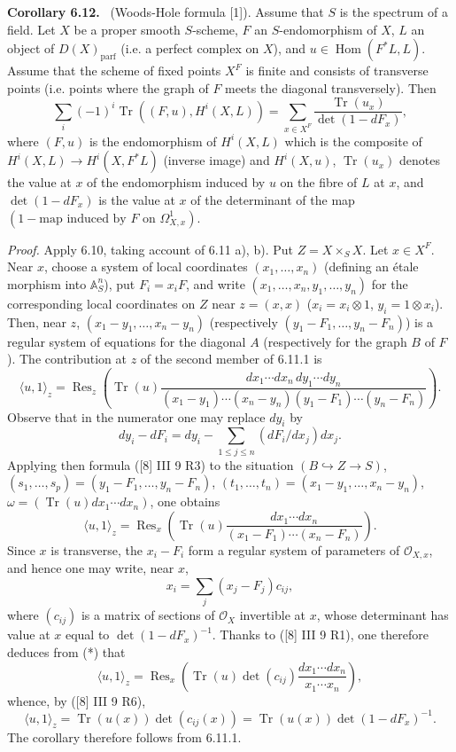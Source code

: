 \documentclass[11pt]{article}
\newenvironment{statement}[1]{\par\medskip\noindent\textbf{#1.}\ }{\par\medskip}
\DeclareMathOperator{\Hom}{Hom}
\providecommand{\OO}{\mathcal{O}}
\providecommand{\parf}{\mathrm{parf}}
\providecommand{\Hom}{\operatorname{Hom}}
\providecommand{\parf}{\mathrm{parf}}
\begin{document}
\begin{statement}{Corollary 6.12}
(Woods-Hole formula [1]). Assume that $S$ is the spectrum of a field. Let $X$ be a proper smooth $S$-scheme, $F$ an $S$-endomorphism of $X$, $L$ an object of $D(X)_{\parf}$ (i.e. a perfect complex on $X$), and $u\in\Hom(F^*L,L)$. Assume that the scheme of fixed points $X^F$ is finite and consists of transverse points (i.e. points where the graph of $F$ meets the diagonal transversely). Then
\[
\sum_i(-1)^i\operatorname{Tr}((F,u),H^i(X,L))=
\sum_{x\in X^F}\frac{\operatorname{Tr}(u_x)}{\det(1-dF_x)},
\]
where $(F,u)$ is the endomorphism of $H^i(X,L)$ which is the composite of $H^i(X,L)\to H^i(X,F^*L)$ (inverse image) and $H^i(X,u)$, $\operatorname{Tr}(u_x)$ denotes the value at $x$ of the endomorphism induced by $u$ on the fibre of $L$ at $x$, and $\det(1-dF_x)$ is the value at $x$ of the determinant of the map $(1-\text{map induced by }F\text{ on }\Omega^1_{X,x})$.

\emph{Proof.} Apply 6.10, taking account of 6.11 a), b). Put $Z=X\times_S X$. Let $x\in X^F$. Near $x$, choose a system of local coordinates $(x_1,\ldots,x_n)$ (defining an étale morphism into $\mathbb A_S^n$), put $F_i=x_iF$, and write $(x_1,\ldots,x_n,y_1,\ldots,y_n)$ for the corresponding local coordinates on $Z$ near $z=(x,x)$ ($x_i=x_i\otimes1$, $y_i=1\otimes x_i$). Then, near $z$, $(x_1-y_1,\ldots,x_n-y_n)$ (respectively $(y_1-F_1,\ldots,y_n-F_n)$) is a regular system of equations for the diagonal $A$ (respectively for the graph $B$ of $F$). The contribution at $z$ of the second member of 6.11.1 is
\[
\langle u,1\rangle_z=
\operatorname{Res}_z\left(\operatorname{Tr}(u)\frac{dx_1\cdots dx_n\,dy_1\cdots dy_n}{(x_1-y_1)\cdots(x_n-y_n)(y_1-F_1)\cdots(y_n-F_n)}\right).
\]
Observe that in the numerator one may replace $dy_i$ by
\[
dy_i-dF_i=dy_i-\sum_{1\le j\le n}(dF_i/dx_j)dx_j.
\]
Applying then formula ([8] III 9 R3) to the situation $(B\hookrightarrow Z\to S)$, $(s_1,\ldots,s_p)=(y_1-F_1,\ldots,y_n-F_n)$, $(t_1,\ldots,t_n)=(x_1-y_1,\ldots,x_n-y_n)$, $\omega=(\operatorname{Tr}(u)dx_1\cdots dx_n)$, one obtains
\begin{equation}
\tag{*}
\langle u,1\rangle_z=
\operatorname{Res}_x\left(\operatorname{Tr}(u)\frac{dx_1\cdots dx_n}{(x_1-F_1)\cdots(x_n-F_n)}\right).
\end{equation}
Since $x$ is transverse, the $x_i-F_i$ form a regular system of parameters of $\OO_{X,x}$, and hence one may write, near $x$,
\[
x_i=\sum_j(x_j-F_j)c_{ij},
\]
where $(c_{ij})$ is a matrix of sections of $\OO_X$ invertible at $x$, whose determinant has value at $x$ equal to $\det(1-dF_x)^{-1}$. Thanks to ([8] III 9 R1), one therefore deduces from (*) that
\[
\langle u,1\rangle_z=\operatorname{Res}_x\left(\operatorname{Tr}(u)\det(c_{ij})\frac{dx_1\cdots dx_n}{x_1\cdots x_n}\right),
\]
whence, by ([8] III 9 R6),
\[
\langle u,1\rangle_z=\operatorname{Tr}(u(x))\det(c_{ij}(x))=\operatorname{Tr}(u(x))\det(1-dF_x)^{-1}.
\]
The corollary therefore follows from 6.11.1.
\end{statement}
\end{document}
